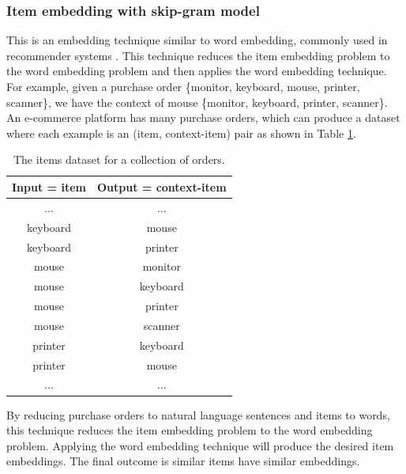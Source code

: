 \documentclass[11pt,twocolumn]{article}
\begin{document}
\subsubsection{Item embedding with skip-gram model}
This is an embedding technique similar to word embedding, commonly used in recommender systems \cite{barkan2016item2vec}.
This technique reduces the item embedding problem to the word embedding problem and then applies the word embedding technique.
For example, given a purchase order \{monitor, keyboard, mouse, printer, scanner\},
we have the context of mouse \{monitor, keyboard, printer, scanner\}.
An e-commerce platform has many purchase orders, which can produce a dataset where each example is an (item, context-item) pair as shown in Table \ref{tab:items}.
\begin{table}[!ht]
	\centering
	\caption{The items dataset for a collection of orders.}
	\begin{tabular}{cc} \hline \rowcolor{blue!30}
		Input = item & Output = context-item \\ \hline
		... & ...       \\ \hline
		keyboard & mouse \\ \hline
		keyboard & printer \\ \hline
		mouse & monitor \\ \hline
		mouse & keyboard \\ \hline
		mouse & printer \\ \hline
		mouse & scanner \\ \hline
		printer & keyboard \\ \hline
		printer & mouse \\ \hline
		... & ...       \\ \hline
	\end{tabular}
	\label{tab:items}
\end{table}
By reducing purchase orders to natural language sentences and items to words,
this technique reduces the item embedding problem to the word embedding problem.
Applying the word embedding technique will produce the desired item embeddings.
The final outcome is similar items have similar embeddings.
\end{document}
